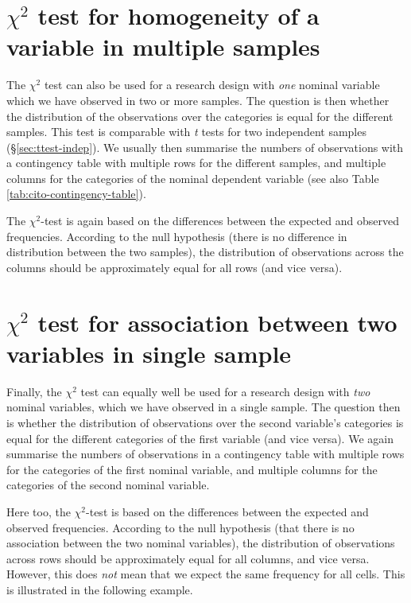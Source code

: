 \documentclass[
]{book}
\begin{document}
\section{\texorpdfstring{\(\chi^2\) test for homogeneity of a variable in multiple samples}{\textbackslash chi\^{}2 test for homogeneity of a variable in multiple samples}}\label{chi2-test-for-homogeneity-of-a-variable-in-multiple-samples}

The \(\chi^2\) test can also be used for a research design with \emph{one} nominal
variable which we have observed in two or more samples. The
question is then whether the distribution of the observations over the
categories is equal for the different samples. This test is comparable with
\emph{t} tests for two independent samples
(§\ref{sec:ttest-indep}). We usually then summarise the numbers of observations
with a contingency table with multiple rows for the different samples,
and multiple columns for the categories of the nominal dependent variable (see also
Table \ref{tab:cito-contingency-table}).

The \(\chi^2\)-test is again based on the differences between the expected and
observed frequencies. According to the null hypothesis (there is no difference
in distribution between the two samples), the distribution of observations
across the columns should be approximately equal for all rows
(and vice versa).

\section{\texorpdfstring{\(\chi^2\) test for association between two variables in single sample}{\textbackslash chi\^{}2 test for association between two variables in single sample}}\label{chi2-test-for-association-between-two-variables-in-single-sample}

Finally, the \(\chi^2\) test can equally well be used for a research design
with \emph{two} nominal variables, which we have observed in a single
sample. The question then is whether the distribution of observations
over the second variable's categories is equal for the different
categories of the first variable (and vice versa). We again summarise
the numbers of observations in a contingency table with multiple rows for
the categories of the first nominal variable, and multiple columns
for the categories of the second nominal variable.

Here too, the \(\chi^2\)-test is based on the differences between the expected and
observed frequencies. According to the null hypothesis (that there is no association
between the two nominal variables), the distribution of observations across
rows should be approximately equal for all columns, and vice versa. However, this
does \emph{not} mean that we expect the same frequency for all cells.
This is illustrated in the following example.
\end{document}
